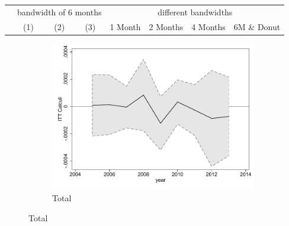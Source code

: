 \documentclass[a4paper ]{article}
\begin{document}
\begin{table}[h]\centering
\def\sym#1{\ifmmode^{#1}\else\(^{#1}\)\fi}
\begin{tabular}{l*{3}{c}|cccc}
\toprule
&\multicolumn{3}{c}{bandwidth of 6 months} & \multicolumn{4}{c}{different bandwidths} \\
 \cmidrule(lr{1em}){2-4} \cmidrule(lr{1em}){5-8}
 &\multicolumn{1}{c}{(1)}&\multicolumn{1}{c}{(2)}&\multicolumn{1}{c}{(3)}& 1 Month & 2 Months & 4 Months & 6M \& Donut \\
\midrule 

\bottomrule
\end{tabular}
\end{table}


\begin{figure}[h!]
	\centering
	\begin{subfigure}[t]{0.5\textwidth}
		\centering
		\includegraphics[width=0.99\textwidth]{R1_LC_Calculi}
		\caption{Total}		
	\end{subfigure}
\end{figure}
\end{document}
